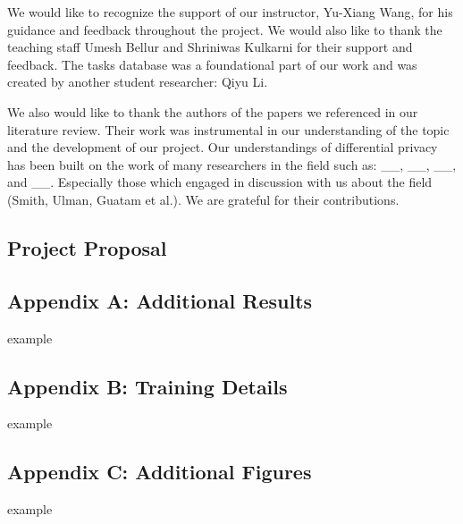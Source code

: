 \documentclass[12pt,letterpaper]{article}
\begin{document}
We would like to recognize the support of our instructor, Yu-Xiang Wang, for his guidance and feedback throughout the project. We would also like to thank the teaching staff Umesh Bellur and Shriniwas Kulkarni for their support and feedback. The tasks database was a foundational part of our work and was created by another student researcher: Qiyu Li. 

We also would like to thank the authors of the papers we referenced in our literature review. Their work was instrumental in our understanding of the topic and the development of our project. Our understandings of differential privacy has been built on the work of many researchers in the field such as: \_\_, \_\_, \_\_, and \_\_. Especially those which engaged in discussion with us about the field (Smith, Ulman, Guatam et al.). We are grateful for their contributions.



%

\makereference








\clearpage
\makeappendix

\subsection{Project Proposal}





\subsection{Appendix A: Additional Results}
example

\subsection{Appendix B: Training Details}
example

\subsection{Appendix C: Additional Figures}
example
\end{document}
